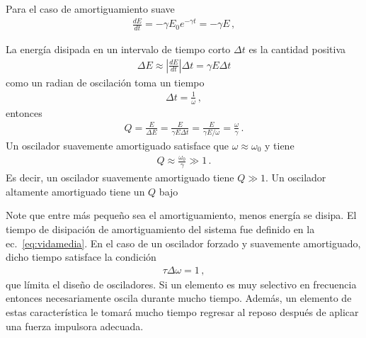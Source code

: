 Para el caso de amortiguamiento suave
\begin{align*}
  \frac{dE}{dt}=-\gamma E_0 e^{-\gamma t}=-\gamma E\,,
\end{align*}

La energía disipada en un intervalo de tiempo corto $\Delta t$ es la cantidad positiva
\begin{align*}
  \Delta E\approx\left|\frac{d E}{d t}\right|\Delta t=\gamma E \Delta t
\end{align*}
como un radian de oscilación toma un tiempo
\begin{align*}
  \Delta t=\frac{1}{\omega}\,,
\end{align*}
entonces
\begin{align}
  \label{eq:calidad}
  Q=\frac{E}{\Delta E}=\frac{E}{\gamma E \Delta t}=\frac{E}{\gamma E/\omega}=\frac{\omega}{\gamma}\,.
\end{align}
Un oscilador suavemente amortiguado satisface que $\omega\approx\omega_0$ y tiene
\begin{align*}
 Q \approx \frac{\omega_0}{\gamma}\gg 1\,.
\end{align*}
Es decir, un oscilador suavemente amortiguado tiene $Q\gg 1$. Un oscilador altamente amortiguado tiene un $Q$ bajo




Note que entre más pequeño sea el amortiguamiento, menos energía se disipa. El tiempo de disipación de amortiguamiento del sistema  fue definido en la ec.~\eqref{eq:vidamedia}. En el caso de un oscilador forzado y suavemente amortiguado, dicho tiempo satisface la condición
\begin{align*}
  \tau \Delta \omega =1\,,
\end{align*}
que límita el diseño de osciladores. Si un elemento es muy selectivo en frecuencia entonces necesariamente oscila durante mucho tiempo. Además,  un elemento de estas característica le tomará mucho tiempo regresar al reposo después de aplicar una fuerza impulsora adecuada. 

